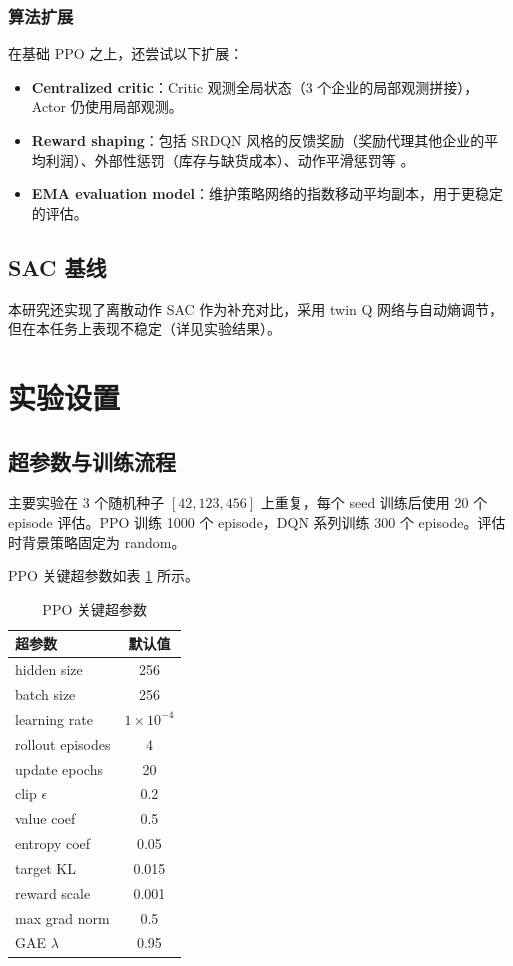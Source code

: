 \documentclass{article}
\begin{document}
\subsubsection{算法扩展}

在基础 PPO 之上，还尝试以下扩展：
\begin{itemize}[leftmargin=2em]
  \item \textbf{Centralized critic}：Critic 观测全局状态（3 个企业的局部观测拼接），Actor 仍使用局部观测。
  \item \textbf{Reward shaping}：包括 SRDQN 风格的反馈奖励（奖励代理其他企业的平均利润）、外部性惩罚（库存与缺货成本）、动作平滑惩罚等 \citep{ Chavez2020}。
  \item \textbf{EMA evaluation model}：维护策略网络的指数移动平均副本，用于更稳定的评估。
\end{itemize}

\subsection{SAC 基线}

本研究还实现了离散动作 SAC \citep{haarnoja2018soft} 作为补充对比，采用 twin Q 网络与自动熵调节，但在本任务上表现不稳定（详见实验结果）。

\section{实验设置}

\subsection{超参数与训练流程}

主要实验在 3 个随机种子 $[42,123,456]$ 上重复，每个 seed 训练后使用 20 个 episode 评估。PPO 训练 1000 个 episode，DQN 系列训练 300 个 episode。评估时背景策略固定为 random。

PPO 关键超参数如表 \ref{tab:ppo-hparams} 所示。

\begin{table}[htbp]
  \centering
  \caption{PPO 关键超参数}
  \label{tab:ppo-hparams}
  \begin{tabular}{lc}
    \toprule
    超参数 & 默认值 \\
    \midrule
    hidden size & 256 \\
    batch size & 256 \\
    learning rate & $1\times10^{-4}$ \\
    rollout episodes & 4 \\
    update epochs & 20 \\
    clip $\epsilon$ & 0.2 \\
    value coef & 0.5 \\
    entropy coef & 0.05 \\
    target KL & 0.015 \\
    reward scale & 0.001 \\
    max grad norm & 0.5 \\
    GAE $\lambda$ & 0.95 \\
    \bottomrule
  \end{tabular}
\end{table}
\end{document}
